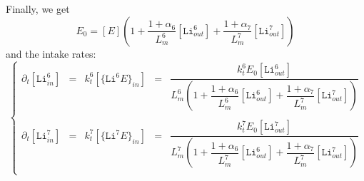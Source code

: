 \documentclass[aps,onecolumn]{revtex4}
\newcommand{\mychem}[1]{\mathtt{#1}}
\begin{document}
Finally, we get
\begin{equation}
	E_0 = [E] \left( 1 + \dfrac{1+\alpha_6}{L_m^6} [\mathtt{Li}^6_{out}] + \dfrac{1+\alpha_7}{L_m^7} [\mathtt{Li}^7_{out}] \right)
\end{equation}
and the intake rates:
\begin{equation}
	\left\lbrace
	\begin{array}{rclcl}
	\partial_t [\mychem{Li}^6_{in}] & = & k_t^6[\lbrace\mychem{Li}^6E\rbrace_{in}] & = & 
	\dfrac{k_t^6E_0[\mathtt{Li}^6_{out}]}{L_m^6\left( 1 + \dfrac{1+\alpha_6}{L_m^6} [\mathtt{Li}^6_{out}] + \dfrac{1+\alpha_7}{L_m^7} [\mathtt{Li}^7_{out}] \right)} \\
	\\
	\partial_t [\mychem{Li}^7_{in}] & = & k_t^7[\lbrace\mychem{Li}^7E\rbrace_{in}] & = & 
	\dfrac{k_t^7E_0[\mathtt{Li}^7_{out}]}{L_m^7\left( 1 + \dfrac{1+\alpha_6}{L_m^7} [\mathtt{Li}^6_{out}] + \dfrac{1+\alpha_7}{L_m^7} [\mathtt{Li}^7_{out}] \right)} \\
	\end{array}
	\right.
\end{equation}
\end{document}
